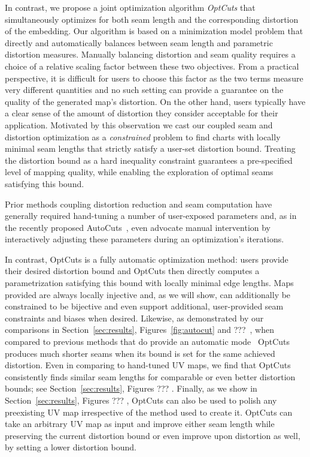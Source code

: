 In contrast, we propose a joint optimization algorithm {\em OptCuts} that simultaneously optimizes for both seam length and the corresponding distortion of the embedding.
Our algorithm is based on a minimization model problem that directly and automatically balances between seam length and parametric distortion measures. Manually balancing distortion and seam quality requires a choice of a relative scaling factor between these two objectives. From a practical perspective, it is difficult for users to choose this factor as the two terms measure very different quantities and no such setting can provide a guarantee on the quality of the generated map's distortion. 
On the other hand, users typically have a clear sense of the amount of distortion they consider acceptable for their application. Motivated by this observation we cast our coupled seam and distortion optimization as a \emph{constrained} problem to find charts with locally minimal seam lengths that strictly satisfy a user-set distortion bound. Treating the distortion bound as a hard inequality constraint guarantees a pre-specified level of mapping quality, while enabling the exploration of optimal seams satisfying this bound. %

Prior methods coupling distortion reduction and seam computation have generally required hand-tuning a number of user-exposed parameters and, as in the recently proposed AutoCuts~\cite{Poranne2017Autocuts}, even advocate manual intervention by interactively adjusting these parameters during an optimization's iterations.

In contrast, OptCuts is a fully automatic optimization method: users provide their desired distortion bound and OptCuts then directly computes a parametrization satisfying this bound with locally minimal edge lengths. Maps provided are always locally injective and, as we will show, can additionally be constrained to be bijective and even support additional, user-provided seam constraints and biases when desired. Likewise, as demonstrated by our comparisons in Section~\ref{sec:results}, Figures~\ref{fig:autocut} and ???~, when compared to previous methods that do provide an automatic mode~\cite{BoundedDistortParam:2002,Poranne2017Autocuts} OptCuts produces much shorter seams when its bound is set for the same achieved distortion. Even in comparing to hand-tuned UV maps, we find that OptCuts consistently finds similar seam lengths for comparable or even better distortion bounds; see Section~\ref{sec:results}, Figures ??? . Finally, as we show in Section~\ref{sec:results}, Figures ??? , OptCuts can also be used to polish any preexisting UV map irrespective of the method used to create it. OptCuts can take an arbitrary UV map as input and improve either seam length while preserving the current distortion bound or even improve upon distortion as well, by setting a lower distortion bound.


